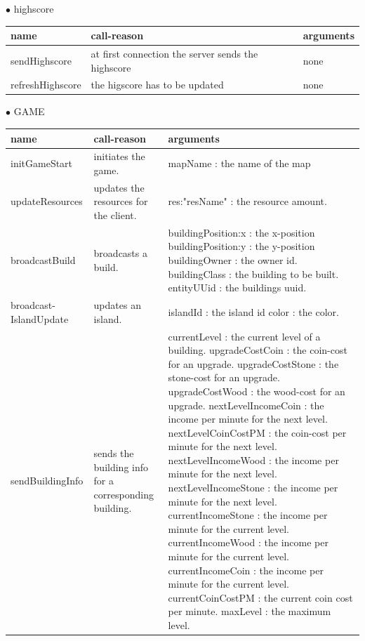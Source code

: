 \documentclass{scrartcl}
\newcommand{\n}{\newline}
\begin{document}
$\bullet$ highscore
\begin{center}
    \begin{tabular}{| p{3.1cm} | p{5cm} | p{5.9cm} |}
        \hline
        \textbf{name} & \textbf{call-reason} & \textbf{arguments} \\ \hline
        sendHighscore & at first connection the server sends the highscore & none \\ \hline
        refreshHighscore & the higscore has to be updated & none \\ \hline
    \end{tabular}
\end{center}
\newpage
$\bullet$ GAME
\begin{center}
    \begin{tabular}{| p{3.1cm} | p{5cm} | p{5.9cm} |}
        \hline
        \textbf{name} & \textbf{call-reason} & \textbf{arguments} \\ \hline
        initGameStart & initiates the game. & mapName : the name of the map \\ \hline
        updateResources & updates the resources for the client. & res:"resName" : the resource amount. \\ \hline
        broadcastBuild & broadcasts a build. & buildingPosition:x : the x-position\n
        buildingPosition:y : the y-position\n 
        buildingOwner : the owner id. \n
        buildingClass : the building to be built. \n
        entityUUid : the buildings uuid. \\ \hline
        broadcast-\n IslandUpdate & updates an island. & islandId : the island id \n
        color : the color. \\ \hline
        sendBuildingInfo & sends the building info for a corresponding building. & currentLevel : the current level of a building. \n
        upgradeCostCoin : the coin-cost for an upgrade. \n
        upgradeCostStone : the stone-cost for an upgrade. \n
        upgradeCostWood : the wood-cost for an upgrade. \n
        nextLevelIncomeCoin : the income per minute for the next level. \n
        nextLevelCoinCostPM : the coin-cost per minute for the next level. \n
        nextLevelIncomeWood : the income per minute for the next level. \n
        nextLevelIncomeStone : the income per minute for the next level. \n
        currentIncomeStone : the income per minute for the current level. \n
        currentIncomeWood : the income per minute for the current level. \n
        currentIncomeCoin : the income per minute for the current level. \n
        currentCoinCostPM : the current coin cost per minute. \n
        maxLevel : the maximum level. \n
        
         \\ \hline
    \end{tabular}
\end{center}
\end{document}

